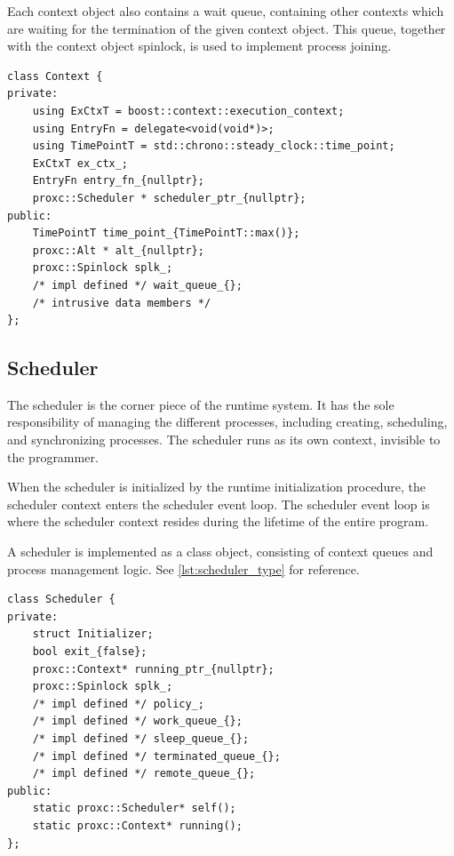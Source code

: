 Each context object also contains a wait queue, containing other contexts which are waiting for the termination of the given context object. This queue, together with the context object spinlock, is used to implement process joining.

\begin{lstfloat}
\begin{lstlisting}[caption={Minimal context type.}, label={lst:context_type}, style={CustomC++}, xleftmargin={2em}]
class Context {
private:
    using ExCtxT = boost::context::execution_context;
    using EntryFn = delegate<void(void*)>;
    using TimePointT = std::chrono::steady_clock::time_point;
    ExCtxT ex_ctx_;
    EntryFn entry_fn_{nullptr};
    proxc::Scheduler * scheduler_ptr_{nullptr};
public:
    TimePointT time_point_{TimePointT::max()};
    proxc::Alt * alt_{nullptr};
    proxc::Spinlock splk_;
    /* impl defined */ wait_queue_{};
    /* intrusive data members */
};
\end{lstlisting}
\end{lstfloat}


\subsection{Scheduler}
\label{subsec:scheduler_implementation}


The scheduler is the corner piece of the runtime system. It has the sole responsibility of managing the different processes, including creating, scheduling, and synchronizing processes. The scheduler runs as its own context, invisible to the programmer.

When the scheduler is initialized by the runtime initialization procedure, the scheduler context enters the scheduler event loop. The scheduler event loop is where the scheduler context resides during the lifetime of the entire program.

A scheduler is implemented as a class object, consisting of context queues and process management logic. See \cref{lst:scheduler_type} for reference.

\begin{lstfloat}
\begin{lstlisting}[caption={Minimal scheduler type.}, label={lst:scheduler_type}, style={CustomC++}, xleftmargin={2em}]
class Scheduler {
private:
    struct Initializer;
    bool exit_{false};
    proxc::Context* running_ptr_{nullptr};
    proxc::Spinlock splk_;
    /* impl defined */ policy_;
    /* impl defined */ work_queue_{};
    /* impl defined */ sleep_queue_{};
    /* impl defined */ terminated_queue_{};
    /* impl defined */ remote_queue_{};
public:
    static proxc::Scheduler* self();
    static proxc::Context* running();
};
\end{lstlisting}
\end{lstfloat}


